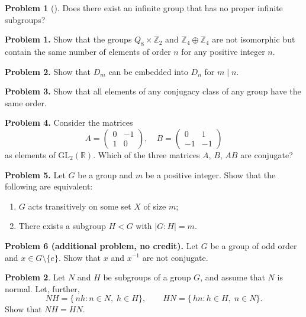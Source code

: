 \documentclass[10pt]{article}
\theoremstyle{definition} %
\newtheorem{problem}{Problem}
\theoremstyle{plain} %
\begin{document}
\begin{problem}[]
  Does there exist an infinite group that has no proper infinite subgroups?
\end{problem}

\noindent\textbf{Problem 1.} Show that the groups $Q_8 \times \mathbb{Z}_2$ and $\mathbb{Z}_4 \oplus \mathbb{Z}_4$ are not isomorphic but contain the same number of elements of order $n$ for any positive integer $n$.

\vspace{1em}

\noindent\textbf{Problem 2.} Show that $D_m$ can be embedded into $D_n$ for $m \mid n$.

\vspace{1em}

\noindent\textbf{Problem 3.} Show that all elements of any conjugacy class of any group have the same order.

\vspace{1em}

\noindent\textbf{Problem 4.} Consider the matrices 
\[
A = \begin{pmatrix} 0 & -1 \\ 1 & 0 \end{pmatrix}, \quad
B = \begin{pmatrix} 0 & 1 \\ -1 & -1 \end{pmatrix}
\]
as elements of $\mathrm{GL}_2(\mathbb{R})$. Which of the three matrices $A$, $B$, $AB$ are conjugate?

\vspace{1em}

\noindent\textbf{Problem 5.} Let $G$ be a group and $m$ be a positive integer. Show that the following are equivalent:
\begin{enumerate}[label=(\alph*)]
    \item $G$ acts transitively on some set $X$ of size $m$;
    \item There exists a subgroup $H < G$ with $|G : H| = m$.
\end{enumerate}

\vspace{1em}

\noindent\textbf{Problem 6 (additional problem, no credit).} Let $G$ be a group of odd order and $x \in G \setminus \{e\}$. Show that $x$ and $x^{-1}$ are not conjugate.

\begin{problem}
  Let $N$ and $H$ be subgroups of a group $G$, and assume that $N$ is normal.  Let, further,
  \[
      NH = \{\,nh : n \in N,\; h \in H\}, \qquad
      HN = \{\,hn : h \in H,\; n \in N\}.
  \]
  Show that $NH = HN$.
\end{problem}
\end{document}
